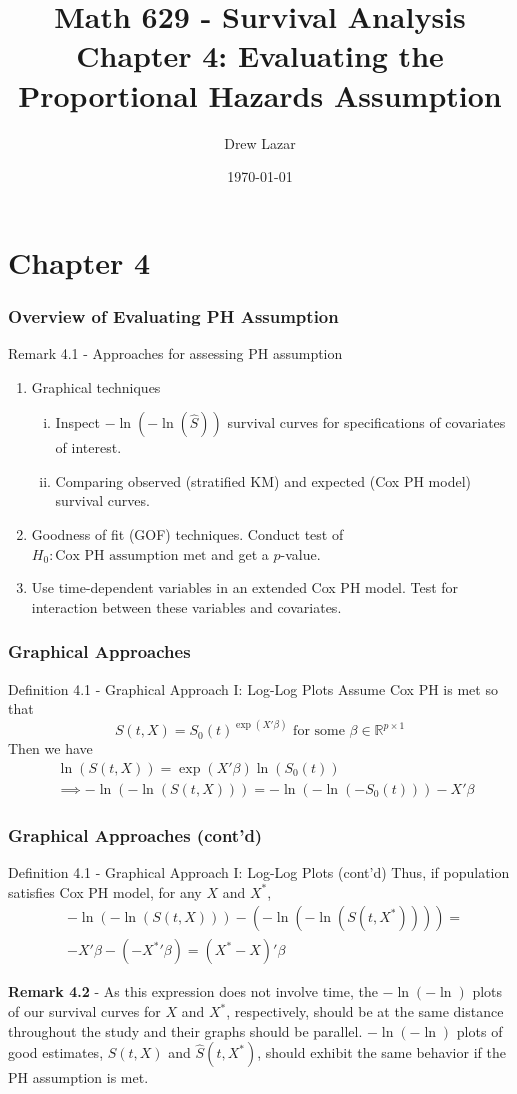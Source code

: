 \documentclass{beamer}
\title{Math 629 - Survival Analysis \\ Chapter 4: Evaluating the Proportional Hazards Assumption}
\author{Drew Lazar}
\institute{Ball State University}
\date{\today}
\theoremstyle{definition}
\begin{document}
\begin{frame}
    \titlepage
\end{frame}



\section{Chapter 4}
\begin{frame}
\frametitle{Overview of Evaluating PH Assumption}
\begin{block}{Remark 4.1 - Approaches for assessing PH assumption}
\begin{enumerate}
\item Graphical techniques
\begin{enumerate}[i.]
\item Inspect $-\ln(-\ln(\hat{S}))$ survival curves for specifications of covariates of interest.
\item Comparing observed (stratified KM) and expected (Cox PH model) survival curves.
\end{enumerate}
\item Goodness of fit (GOF) techniques. Conduct test of $H_0: \text{Cox PH assumption met}$ and get a $p$-value.
\item Use time-dependent variables in an extended Cox PH model. Test for interaction between these variables and covariates.
\end{enumerate}
\end{block}
\end{frame}
\begin{frame}
\frametitle{Graphical Approaches}
\begin{block}{Definition 4.1 - Graphical Approach I: Log-Log Plots}
Assume Cox PH is met so that
\[ S(t,X) = S_0(t)^{\exp(X'\beta)} \text{ for some }  \beta \in \mathbb{R}^{p\times1}
\]
Then we have
\begin{align*}
&\ln( S(t,X)) = \exp(X'\beta)\ln(S_0(t)) \\
&\implies -\ln(-\ln(S(t,X))) = -\ln(-\ln(-S_0(t))) - X'\beta
\end{align*}
\end{block}
\end{frame}

\begin{frame}
\frametitle{Graphical Approaches (cont'd)}
\begin{block}{Definition 4.1 - Graphical Approach I: Log-Log Plots (cont'd)}
Thus, if population satisfies Cox PH model, for any $X$ and $X^*$,
\begin{align*}
&-\ln(-\ln(S(t,X)))- (-\ln(-\ln(S(t,X^*)))) = \\
&-X'\beta - (-{X^*}'\beta) =(X^*-X)'\beta
\end{align*}
\end{block}
\textbf{Remark 4.2 }- As this expression does not involve time, the  $-\ln(-\ln)$ plots of our survival curves for $X$ and $X^*$, respectively, should be at the same distance throughout the study and their graphs should be parallel. $-\ln(-\ln)$ plots of good estimates, $\hat{S}(t,X)$ and $\hat{S}(t,X^*)$, should exhibit the same behavior if the PH assumption is met.
\end{frame}
\end{document}
